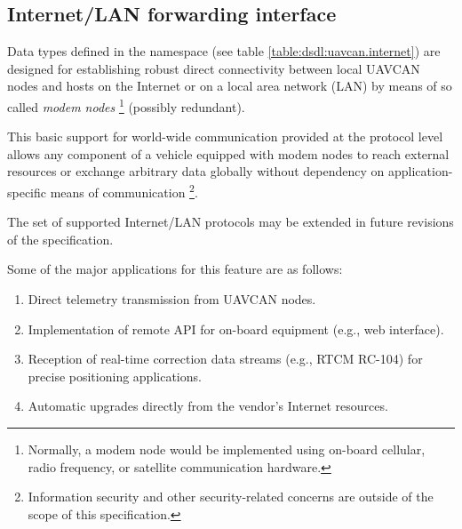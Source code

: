 
\subsection{Internet/LAN forwarding interface}

Data types defined in the namespace  (see table \ref{table:dsdl:uavcan.internet})
are designed for establishing robust direct connectivity between local UAVCAN nodes and hosts on the Internet
or on a local area network (LAN) by means of so called \emph{modem nodes}%
\footnote{Normally, a modem node would be implemented using on-board cellular, radio frequency,
or satellite communication hardware.}
(possibly redundant).

This basic support for world-wide communication provided at the protocol level allows any component
of a vehicle equipped with modem nodes to reach external resources or exchange arbitrary data globally
without dependency on application-specific means of communication%
\footnote{Information security and other security-related concerns are outside of the scope of this specification.}.

The set of supported Internet/LAN protocols may be extended in future revisions of the specification.

Some of the major applications for this feature are as follows:

\begin{enumerate}
    \item Direct telemetry transmission from UAVCAN nodes.
    \item Implementation of remote API for on-board equipment (e.g., web interface).
    \item Reception of real-time correction data streams (e.g., RTCM RC-104) for precise positioning applications.
    \item Automatic upgrades directly from the vendor's Internet resources.
\end{enumerate}


